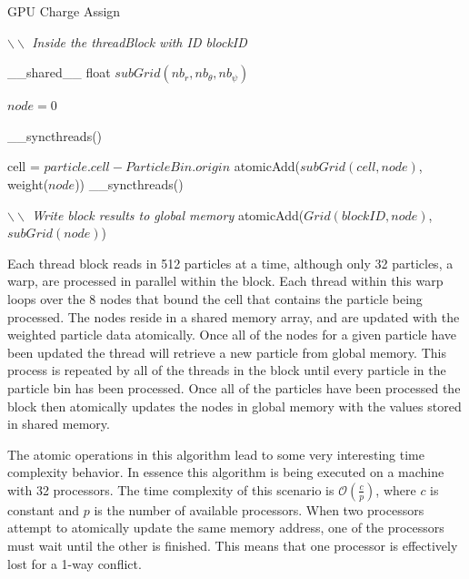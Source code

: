 \begin{algorithm}
	\caption{GPU Charge Assign}
	\label{alg:gpu_c2mesh}
	\begin{algorithmic}
			\STATE \emph{$\backslash \backslash$ Inside the threadBlock with ID blockID}

			\STATE \_\_shared\_\_ float $subGrid(nb_r,nb_{\theta},nb_{\psi})$

			\STATE $node = 0$
			\ENDFOR
			
			\STATE \_\_syncthreads()
			

				\STATE cell = $particle.cell - ParticleBin.origin$
					\STATE atomicAdd($subGrid(cell,node)$, weight($node$))
				\ENDFOR
			\ENDFOR
			\STATE \_\_syncthreads()

			\STATE \emph{$\backslash \backslash$ Write block results to global memory}
				\STATE atomicAdd($Grid(blockID,node)$, $subGrid(node)$)
			\ENDFOR
			
		\ENDFOR
	\end{algorithmic}
\end{algorithm}

Each thread block reads in 512 particles at a time, although only 32 particles, a warp, are processed in parallel within the block. Each thread within this warp loops over the 8 nodes that bound the cell that contains the particle being processed. The nodes reside in a shared memory array, and are updated with the weighted particle data atomically. Once all of the nodes for a given particle have been updated the thread will retrieve a new particle from global memory. This process is repeated by all of the threads in the block until every particle in the particle bin has been processed. Once all of the particles have been processed the block then atomically updates the nodes in global memory with the values stored in shared memory.  

The atomic operations in this algorithm lead to some very interesting time complexity behavior. In essence this algorithm is being executed on a machine with 32 processors. The time complexity of this scenario is $\mathcal{O}(\frac{c}{p})$, where $c$ is constant and $p$ is the number of available processors. When two processors attempt to atomically update the same memory address, one of the processors must wait until the other is finished. This means that one processor is effectively lost for a 1-way conflict. 

